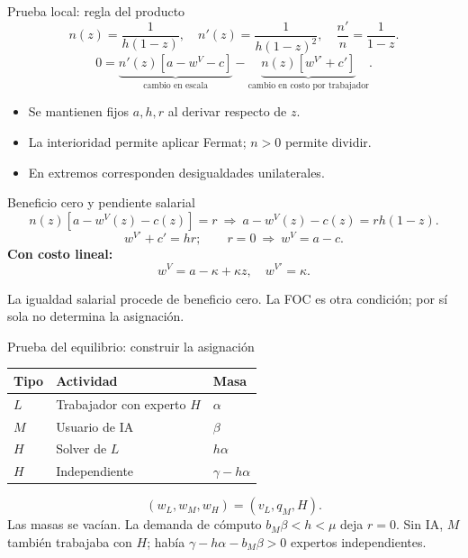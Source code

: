 \documentclass[aspectratio=169,11pt]{beamer}
\begin{document}
\begin{frame}{Prueba local: regla del producto}
\[
n(z)=\frac{1}{h(1-z)},\quad n'(z)=\frac{1}{h(1-z)^2},\quad\frac{n'}n=\frac1{1-z}.
\]
\[
0=\underbrace{n'(z)[a-w^V-c]}_{\text{cambio en escala}}
-\underbrace{n(z)[w^{V\prime}+c']}_{\text{cambio en costo por trabajador}}.
\]
\begin{itemize}
\item Se mantienen fijos $a,h,r$ al derivar respecto de $z$.
\item La interioridad permite aplicar Fermat; $n>0$ permite dividir.
\item En extremos corresponden desigualdades unilaterales.
\end{itemize}
\end{frame}
\begin{frame}{Beneficio cero y pendiente salarial}
\[
n(z)[a-w^V(z)-c(z)]=r
\ \Longrightarrow\ a-w^V(z)-c(z)=rh(1-z).
\]
\[
w^{V\prime}+c'=hr;\qquad r=0\ \Longrightarrow\ w^V=a-c.
\]
\textbf{Con costo lineal:}
\[
w^V=a-\kappa+\kappa z,\quad w^{V\prime}=\kappa.
\]
\begin{keybox}
La igualdad salarial procede de beneficio cero. La FOC es otra condición; por sí sola no determina la asignación.
\end{keybox}
\end{frame}
\begin{frame}{Prueba del equilibrio: construir la asignación}
\begin{center}
\begin{tabular}{lll}\toprule
Tipo & Actividad & Masa\\\midrule
$L$ & Trabajador con experto $H$ & $\alpha$\\
$M$ & Usuario de IA & $\beta$\\
$H$ & Solver de $L$ & $h\alpha$\\
$H$ & Independiente & $\gamma-h\alpha$\\\bottomrule
\end{tabular}
\end{center}
\[
(w_L,w_M,w_H)=(v_L,q_M,H).
\]
Las masas se vacían. La demanda de cómputo $b_M\beta<h<\mu$ deja $r=0$.
\medskip
Sin IA, $M$ también trabajaba con $H$; había $\gamma-h\alpha-b_M\beta>0$ expertos independientes.
\end{frame}
\end{document}

